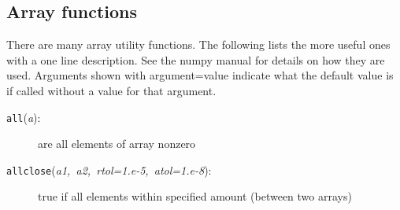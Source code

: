 \subsection{Array functions}

There are many array utility functions. The following lists the more
useful ones with a one line description. See the numpy manual for
details on how they are used. Arguments shown with argument=value
indicate what the default value is if called without a value for that
argument.

\begin{description}
\item [{\texttt{all}\textmd{(}\textmd{\emph{a}}\textmd{):}}] are all elements
of array nonzero
\item [{\texttt{allclose}\textmd{(}\textmd{\emph{a1,~a2,~rtol=1.e-5,~atol=1.e-8}}\textmd{):}}] true
if all elements within specified amount (between two arrays)


\end{description}
